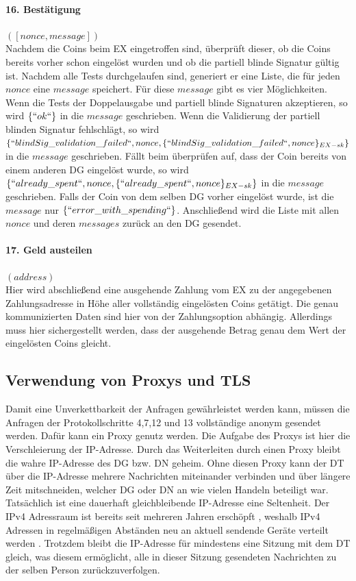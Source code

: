 \documentclass[
	fontsize=11pt,
	headings=small,
	parskip=half,           %
	bibliography=totoc,
	numbers=noenddot,       %
	open=any,               %
]{scrreprt}
\begin{document}
\paragraph{16. Bestätigung} $([nonce, message])$\\
Nachdem die Coins beim EX eingetroffen sind, überprüft dieser, ob die Coins bereits vorher schon eingelöst wurden und ob die partiell blinde Signatur gültig ist. Nachdem alle Tests durchgelaufen sind, generiert er eine Liste, die für jeden $nonce$ eine $message$ speichert. Für diese $message$ gibt es vier Möglichkeiten. Wenn die Tests der Doppelausgabe und partiell blinde Signaturen akzeptieren, so wird $\{``ok``\}$ in die $message$ geschrieben. Wenn die Validierung der partiell blinden Signatur fehlschlägt, so wird $\{``blindSig\_validation\_failed``, nonce, \{``blindSig\_validation\_failed``, nonce\}_{EX-sk}\}$ in die $message$ geschrieben. Fällt beim überprüfen auf, dass der Coin bereits von einem anderen DG eingelöst wurde, so wird $\{``already\_spent``, nonce, \{``already\_spent``, nonce\}_{EX-sk}\}$ in die $message$ geschrieben. Falls der Coin von dem selben DG vorher eingelöst wurde, ist die $message$ nur $\{``error\_with\_spending``\}$. Anschließend wird die Liste mit allen $nonce$ und deren $messages$ zurück an den DG gesendet.

\paragraph{17. Geld austeilen} $(address)$\\
Hier wird abschließend eine ausgehende Zahlung vom EX zu der angegebenen Zahlungsadresse in Höhe aller vollständig eingelösten Coins getätigt. Die genau kommunizierten Daten sind hier von der Zahlungsoption abhängig. Allerdings muss hier sichergestellt werden, dass der ausgehende Betrag genau dem Wert der eingelösten Coins gleicht.

\subsection{Verwendung von Proxys und TLS}
Damit eine Unverkettbarkeit der Anfragen gewährleistet werden kann, müssen die Anfragen der Protokollschritte 4,7,12 und 13 vollständige anonym gesendet werden. Dafür kann ein Proxy genutz werden. Die Aufgabe des Proxys ist hier die Verschleierung der IP-Adresse. Durch das Weiterleiten durch einen Proxy bleibt die wahre IP-Adresse des DG bzw. DN geheim. Ohne diesen Proxy kann der DT über die IP-Adresse mehrere Nachrichten miteinander verbinden und über längere Zeit mitschneiden, welcher DG oder DN an wie vielen Handeln beteiligt war. Tatsächlich ist eine dauerhaft gleichbleibende IP-Adresse eine Seltenheit. Der IPv4 Adressraum ist bereits seit mehreren Jahren erschöpft \cite{tls-huston2008changing}, weshalb IPv4 Adressen in regelmäßigen Abständen neu an aktuell sendende Geräte verteilt werden \cite{tls-jin2007identifying}. Trotzdem bleibt die IP-Adresse für mindestens eine Sitzung mit dem DT gleich, was diesem ermöglicht, alle in dieser Sitzung gesendeten Nachrichten zu der selben Person zurückzuverfolgen. 
\end{document}
